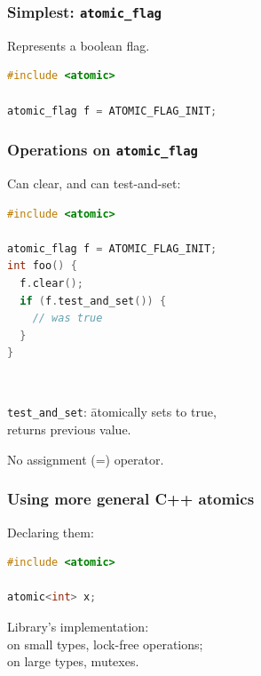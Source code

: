 \begin{frame}[fragile]
  \frametitle{Simplest: {\tt atomic\_flag}}
  
    Represents a boolean flag.\\[1em]
    \begin{lstlisting}[language=C]
#include <atomic>

atomic_flag f = ATOMIC_FLAG_INIT;
    \end{lstlisting}
  
\end{frame}

\begin{frame}[fragile]
  \frametitle{Operations on {\tt atomic\_flag}}
  
    Can clear, and can test-and-set:
    \begin{lstlisting}[language=C]
#include <atomic>

atomic_flag f = ATOMIC_FLAG_INIT;
int foo() {
  f.clear();
  if (f.test_and_set()) {
    // was true
  }
}
    \end{lstlisting}
    ~\\
    \begin{tabbing}
      {\tt test\_and\_set}: \= atomically sets to true, \\
      \> returns previous value.
    \end{tabbing}
    No assignment (=) operator.
  
\end{frame}



\begin{frame}[fragile]
  \frametitle{Using more general C++ atomics}


    Declaring them:
  
\begin{lstlisting}[language=C]
#include <atomic>

atomic<int> x;
\end{lstlisting}

Library's implementation: \\
\hspace*{1em} on small types, lock-free operations;\\
\hspace*{1em} on large types, mutexes.

  

\end{frame}

